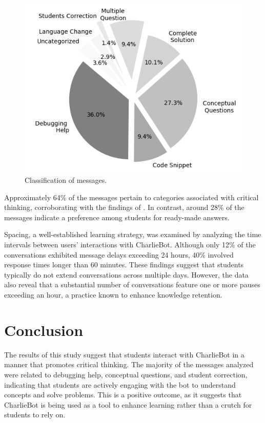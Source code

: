 \documentclass[a4paper,twoside]{article}
\begin{document}
\begin{figure}[h!]
    \centering
    \includegraphics[scale=0.55]{img/figure1.png}
    \caption{Classification of messages.}
    \label{fig:graph1}
\end{figure}

Approximately 64\% of the messages pertain to categories associated with
critical thinking, corroborating with the findings of
\cite{Ghimire24}. In contrast, around 28\% of the messages
indicate a preference among students for ready-made answers.


Spacing, a well-established learning strategy, was examined by analyzing
 the time intervals between users’ interactions with CharlieBot. Although
 only 12\% of the conversations exhibited message delays exceeding 24 hours,
40\% involved response times longer than 60 minutes. These findings suggest
that students typically do not extend conversations across multiple days.
However, the data also reveal that a substantial number of conversations
feature one or more pauses exceeding an hour, a practice known to enhance
knowledge retention.





\section{Conclusion}

The results of this study suggest that students interact with CharlieBot in a
manner that promotes critical thinking. The majority of the messages analyzed
were related to debugging help, conceptual questions, and student correction,
indicating that students are actively engaging with the bot to understand
concepts and solve problems. This is a positive outcome, as it suggests that
CharlieBot is being used as a tool to enhance learning rather than a crutch for
students to rely on.
\end{document}

